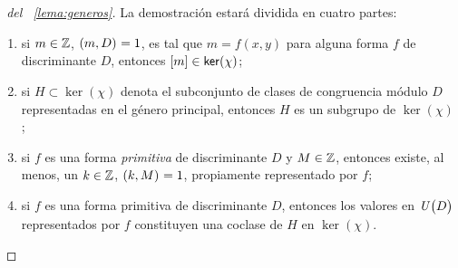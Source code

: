 \begin{proof}[\proofname~del \lemaname~\ref{lema:generos}]
	La demostraci\'on estar\'a dividida en cuatro partes:
	\begin{enumerate}[1]
		\item\label{item:lema:generos:nucleo}
			si $m\in\Enteros$, $\mcd{m,D}=1$, es tal que
			$m=f(x,y)$ para alguna forma $f$ de discriminante
			$D$, entonces $\clase m\in\ker(\chi)$;
		\item\label{item:lema:generos:subgrupo}
			si $H\subset\ker(\chi)$ denota el subconjunto de
			clases de congruencia m\'odulo $D$ representadas
			en el g\'enero principal,
			entonces $H$ es un subgrupo de $\ker(\chi)$;
		\item\label{item:lema:generos:primitivas}
			si $f$ es una forma \emph{primitiva} de discriminante
			$D$ y $M\in\Enteros$, entonces existe, al menos,
			un $k\in\Enteros$, $\mcd{k,M}=1$, propiamente
			representado por $f$;
		\item\label{item:lema:generos:coclases}
			si $f$ es una forma primitiva de discriminante $D$,
			entonces los valores en $\Unidadesmod[D]$
			representados por $f$ constituyen una coclase de
			$H$ en $\ker(\chi)$.
	\end{enumerate}


\end{proof}
